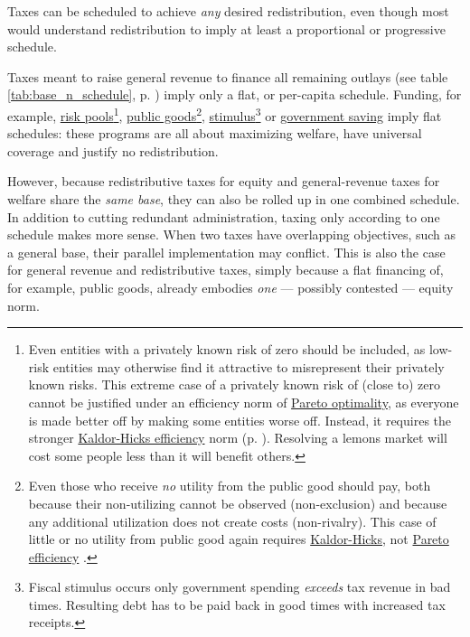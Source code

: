 \begin{description}
	Taxes can be scheduled to achieve \emph{any} desired redistribution, even though most would understand redistribution to imply at least a proportional or progressive schedule. 
	
	Taxes meant to raise general revenue to finance all remaining outlays (see table \ref{tab:base_n_schedule}, p. \pageref{tab:base_n_schedule}) imply only a flat, or per-capita schedule. Funding, for example, \hyperref[sec:adverse_selection]{risk pools}\footnote{
		Even entities with a privately known risk of zero should be included, as low-risk entities may otherwise find it attractive to misrepresent their privately known risks. This extreme case of a privately known risk of (close to) zero cannot be justified under an efficiency norm of \hyperref[sec:Pareto]{Pareto optimality}, as everyone is made better off by making some entities worse off. Instead, it requires the stronger \hyperref[sec:KaldorHicks]{Kaldor-Hicks efficiency} norm (p. \pageref{sec:Efficiency})\citep{Kaldor1939,Hicks1939}. Resolving a lemons market will cost some people less than it will benefit others.}, 
	\hyperref[sec:public_good]{public goods}\footnote{
		Even those who receive \emph{no} utility from the public good should pay, both because their non-utilizing cannot be observed (non-exclusion) and because any additional utilization does not create costs (non-rivalry). This case of little or no utility from public good again requires \hyperref[sec:KaldorHicks]{Kaldor-Hicks}, not \hyperref[sec:Pareto]{Pareto efficiency} \citep{Kaldor1939,Hicks1939}.}, 
	\hyperref[sec:fiscal_stimulus]{stimulus}\footnote{
		Fiscal stimulus occurs only government spending \emph{exceeds} tax revenue in bad times. Resulting debt has to be paid back in good times with increased tax receipts.} 
	or \hyperref[sec:government_saves]{government saving} imply flat schedules: these programs are all about maximizing welfare, have universal coverage and justify no redistribution. 
	
	However, %
	 \label{sec:redistribution_and_revenue_are_one} because redistributive taxes for equity and general-revenue taxes for welfare share the \emph{same base}, they can also be rolled up in one combined schedule. In addition to cutting redundant administration, taxing only according to one schedule makes more sense. When two taxes have overlapping objectives, such as a general base, their parallel implementation may conflict. This is also the case for general revenue and redistributive taxes, simply because a flat financing of, for example, public goods, already embodies \emph{one} --- possibly contested --- equity norm. 
	
\end{description}


